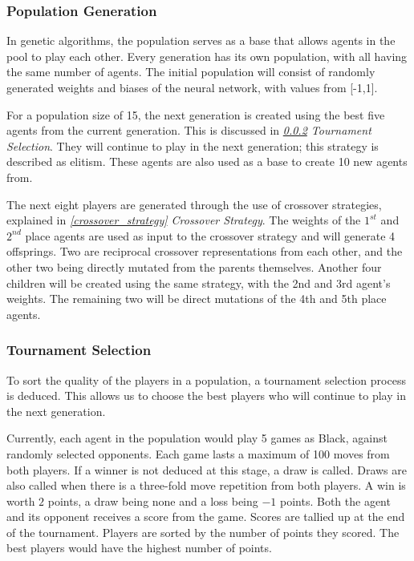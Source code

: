 \documentclass[12pt,a4paper]{article}
\begin{document}
        \subsubsection{Population Generation} \label{population_generation}
            In genetic algorithms, the population serves as a base that allows agents in the pool to play each other. Every generation has its own population, with all having the same number of agents. The initial population will consist of randomly generated weights and biases of the neural network, with values from [-1,1]. 
            
            For a population size of 15, the next generation is created using the best five agents from the current generation. This is discussed in {\it{\ref{tournament_selection} Tournament Selection}}. 
            They will continue to play in the next generation; this strategy is described as elitism. These agents are also used as a base to create 10 new agents from. 
            
            The next eight players are generated through the use of crossover strategies, explained in {\it{\ref{crossover_strategy} Crossover Strategy}}. The weights of the $1^{st}$ and $2^{nd}$ place agents are used as input to the crossover strategy and will generate 4 offsprings. Two are reciprocal crossover representations from each other, and the other two being directly mutated from the parents themselves. Another four children will be created using the same strategy, with the 2nd and 3rd agent's weights. The remaining two will be direct mutations of the 4th and 5th place agents.

        \subsubsection{Tournament Selection} \label{tournament_selection}

            To sort the quality of the players in a population, a tournament selection process is deduced. This allows us to choose the best players who will continue to play in the next generation.

            Currently, each agent in the population would play 5 games as Black, against randomly selected opponents. Each game lasts a maximum of 100 moves from both players. If a winner is not deduced at this stage, a draw is called. Draws are also called when there is a three-fold move repetition from both players. A win is worth $2$ points, a draw being none and a loss being $-1$ points. Both the agent and its opponent receives a score from the game.
            Scores are tallied up at the end of the tournament. Players are sorted by the number of points they scored. The best players would have the highest number of points.
            
\end{document}
